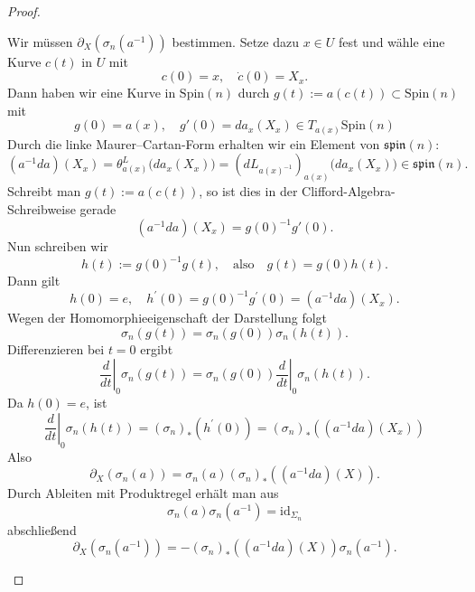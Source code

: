 \documentclass[10pt, letterpaper]{article}
\newcommand{\Spin}{\mathrm{Spin}}
\begin{document}
\begin{proof}
\begin{enumerate}
    Wir müssen $\partial_X(\sigma_n(a^{-1}))$ bestimmen. 
    Setze dazu $x \in U$ fest und wähle eine Kurve $c(t)$ in $U$ mit
    $$c(0)=x, \quad \dot{c}(0)=X_x.$$
    Dann haben wir eine Kurve in $\Spin(n)$ durch $g(t):=a(c(t)) \subset  \Spin(n)$ mit
    $$g(0)=a(x),\quad g'(0)=da_x(X_x)\in T_{a(x)}\Spin(n)$$
    Durch die linke Maurer--Cartan-Form erhalten wir ein Element von
    \(\mathfrak{spin}(n)\):
    \[
    (a^{-1}da)(X_x)
    =
    \theta^L_{a(x)}\bigl(da_x(X_x)\bigr)
    =
    (dL_{a(x)^{-1}})_{a(x)}\bigl(da_x(X_x)\bigr)
    \in \mathfrak{spin}(n).
    \]
    Schreibt man \(g(t):=a(c(t))\), so ist dies in der Clifford-Algebra-Schreibweise gerade
    \[
    (a^{-1}da)(X_x)=g(0)^{-1}g'(0).
    \]
    Nun schreiben wir
    $$h(t):=g(0)^{-1} g(t), \quad \text{also} \quad g(t)=g(0) h(t).$$
    Dann gilt
    $$h(0)=e, \quad h^{\prime}(0)=g(0)^{-1} g^{\prime}(0)=\left(a^{-1} d a\right)\left(X_x\right).$$
    Wegen der Homomorphieeigenschaft der Darstellung folgt
    $$\sigma_n(g(t))=\sigma_n(g(0)) \sigma_n(h(t)).$$
    Differenzieren bei $t=0$ ergibt
    $$\left.\frac{d}{d t}\right|_0 \sigma_n(g(t))=\left.\sigma_n(g(0)) \frac{d}{d t}\right|_0 \sigma_n(h(t)).$$
    Da $h(0)=e$, ist
    $$\left.\frac{d}{d t}\right|_0 \sigma_n(h(t))=\left(\sigma_n\right)_*\left(h^{\prime}(0)\right)=\left(\sigma_n\right)_*\left(\left(a^{-1} d a\right)\left(X_x\right)\right)$$
    Also
    $$\partial_X\left(\sigma_n(a)\right)=\sigma_n(a)\left(\sigma_n\right)_*\left(\left(a^{-1} d a\right)(X)\right).$$
    Durch Ableiten mit Produktregel erhält man aus 
    $$\sigma_n(a) \sigma_n\left(a^{-1}\right)=\mathrm{id}_{\Sigma_n}$$
    abschließend 
    $$\partial_X\left(\sigma_n\left(a^{-1}\right)\right)=-\left(\sigma_n\right)_*\left(\left(a^{-1} d a\right)(X)\right) \sigma_n\left(a^{-1}\right).$$


\end{enumerate}
\end{proof}
\end{document}
